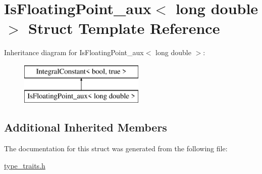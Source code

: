 \hypertarget{struct_is_floating_point__aux_3_01long_01double_01_4}{}\section{Is\+Floating\+Point\+\_\+aux$<$ long double $>$ Struct Template Reference}
\label{struct_is_floating_point__aux_3_01long_01double_01_4}
Inheritance diagram for Is\+Floating\+Point\+\_\+aux$<$ long double $>$\+:\begin{figure}[H]
\begin{center}
\leavevmode
\includegraphics[height=2.000000cm]{struct_is_floating_point__aux_3_01long_01double_01_4}
\end{center}
\end{figure}
\subsection*{Additional Inherited Members}


The documentation for this struct was generated from the following file\+:\begin{DoxyCompactItemize}
\item 
\hyperlink{type__traits_8h}{type\+\_\+traits.\+h}\end{DoxyCompactItemize}

